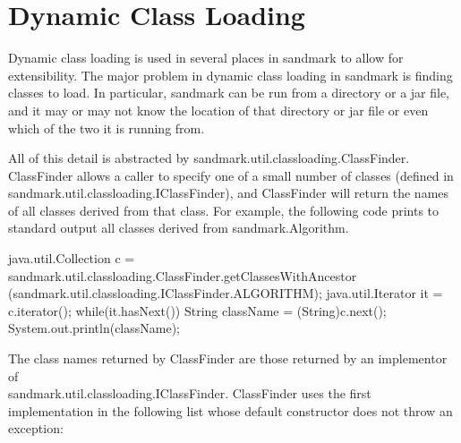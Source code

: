 \section{Dynamic Class Loading}
Dynamic class loading is used in several places in sandmark to allow
for extensibility.  The major problem in dynamic class loading in sandmark
is finding classes to load.  In particular, sandmark can be run from a 
directory or a jar file, and it may or may not know the location of that 
directory or jar file or even which of the two it is running from.  

All of this detail is abstracted by sandmark.util.classloading.ClassFinder.
ClassFinder allows a caller to specify one of a small number of classes 
(defined in sandmark.util.classloading.IClassFinder), and
ClassFinder will return the names of all classes derived from that class.  For example,
the following code prints to standard output all classes derived from
sandmark.Algorithm.

\begin{listing}{1}
java.util.Collection c = 
   sandmark.util.classloading.ClassFinder.getClassesWithAncestor
      (sandmark.util.classloading.IClassFinder.ALGORITHM);
java.util.Iterator it = c.iterator();
while(it.hasNext()) {
   String className = (String)c.next();
   System.out.println(className);
}
\end{listing}

The class names returned by ClassFinder are those returned by
an implementor of \\sandmark.util.classloading.IClassFinder.  ClassFinder 
uses the first implementation in the following list
whose default constructor does not throw an exception:

